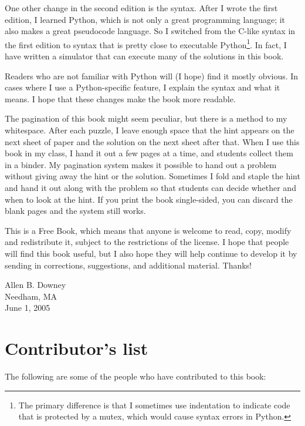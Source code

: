 \documentclass{book}
\begin{document}
One other change in the second edition is the syntax.  After I wrote
the first edition, I learned Python, which is not only a great
programming language; it also makes a great pseudocode language.  So I
switched from the C-like syntax in the first edition to syntax
that is pretty close to executable Python\footnote{The primary
difference is that I sometimes use indentation to indicate code that
is protected by a mutex, which would cause syntax errors in Python.}.
In fact, I have written a simulator that can execute many of the
solutions in this book.

Readers who are not familiar with Python will (I hope) find it mostly
obvious.  In cases where I use a Python-specific feature, I explain the
syntax and what it means.  I hope that these changes make the book
more readable.

The pagination of this book might seem peculiar, but there is a method
to my whitespace.  After each puzzle, I leave enough space that the
hint appears on the next sheet of paper and the solution on the next
sheet after that.  When I use this book in my class, I hand it out a
few pages at a time, and students collect them in a binder.  My
pagination system makes it possible to hand out a problem without
giving away the hint or the solution.  Sometimes I fold and staple the
hint and hand it out along with the problem so that students can
decide whether and when to look at the hint.  If you print the book
single-sided, you can discard the blank pages and the system still
works.

This is a Free Book, which means that anyone is welcome to read,
copy, modify and redistribute it, subject to the restrictions of the
license.  I hope that people
will find this book useful, but I also hope they will help continue
to develop it by sending in corrections, suggestions, and additional
material.  Thanks!

\vspace{0.3in}

\noindent Allen B. Downey \\
\noindent Needham, MA \\
\noindent June 1, 2005 \\


\section*{Contributor's list}

The following are some of the people who have contributed to this
book:
\end{document}
